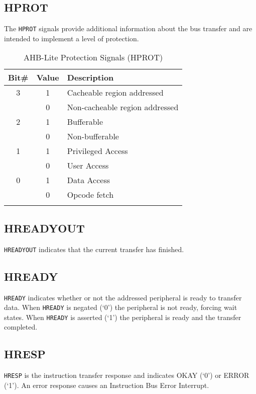 \subsection{HPROT}\label{hprot}

The \texttt{HPROT} signals provide additional information about the bus transfer
and are intended to implement a level of protection.

\begin{longtable}[]{@{}ccl@{}}
	\toprule
		Bit\# & Value & Description\tabularnewline
	\midrule
	\endhead
		3 & 1 & Cacheable region addressed\tabularnewline
		  & 0 & Non-cacheable region addressed\tabularnewline
		2 & 1 & Bufferable\tabularnewline
		  & 0 & Non-bufferable\tabularnewline
		1 & 1 & Privileged Access\tabularnewline
		  & 0 & User Access\tabularnewline
		0 & 1 & Data Access\tabularnewline
		  & 0 & Opcode fetch\tabularnewline
	\bottomrule
	\caption{AHB-Lite Protection Signals (HPROT)}
\end{longtable}

\subsection{HREADYOUT}\label{hreadyout}

\texttt{HREADYOUT} indicates that the current transfer has finished.

\subsection{HREADY}\label{hready}

\texttt{HREADY} indicates whether or not the addressed peripheral is ready to
transfer data. When \texttt{HREADY} is negated (`0') the peripheral is not ready,
forcing wait states. When \texttt{HREADY} is asserted (`1') the peripheral is
ready and the transfer completed.

\subsection{HRESP}\label{hresp}

\texttt{HRESP} is the instruction transfer response and indicates OKAY (`0') or
ERROR (`1'). An error response causes an Instruction Bus Error
Interrupt.